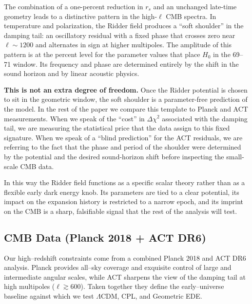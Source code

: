 \documentclass[a4paper,11pt]{article}
\begin{document}
The combination of a one-percent reduction in $r_{s}$ and an unchanged late-time geometry leads to a distinctive pattern in the high-$\ell$ CMB spectra. In temperature and polarization, the Ridder field produces a ``soft shoulder'' in the damping tail: an oscillatory residual with a fixed phase that crosses zero near $\ell \sim 1200$ and alternates in sign at higher multipoles. The amplitude of this pattern is at the percent level for the parameter values that place $H_{0}$ in the 69--71 window. Its frequency and phase are determined entirely by the shift in the sound horizon and by linear acoustic physics.

\textbf{This is not an extra degree of freedom.} Once the Ridder potential is chosen to sit in the geometric window, the soft shoulder is a parameter-free prediction of the model. In the rest of the paper we compare this template to Planck and ACT measurements. When we speak of the ``cost'' in $\Delta\chi^{2}$ associated with the damping tail, we are measuring the statistical price that the data assign to this fixed signature. When we speak of a ``blind prediction'' for the ACT residuals, we are referring to the fact that the phase and period of the shoulder were determined by the potential and the desired sound-horizon shift before inspecting the small-scale CMB data.

In this way the Ridder field functions as a specific scalar theory rather than as a flexible early dark energy knob. Its parameters are tied to a clear potential, its impact on the expansion history is restricted to a narrow epoch, and its imprint on the CMB is a sharp, falsifiable signal that the rest of the analysis will test.


\subsection{CMB Data (Planck 2018 + ACT DR6)}
\label{sec:cmb_data}

Our high--redshift constraints come from a combined Planck 2018 and ACT DR6 analysis. Planck provides all--sky coverage and exquisite control of large and intermediate angular scales, while ACT sharpens the view of the damping tail at high multipoles ($\ell \gtrsim 600$). Taken together they define the early--universe baseline against which we test $\Lambda$CDM, CPL, and Geometric EDE.
\end{document}
